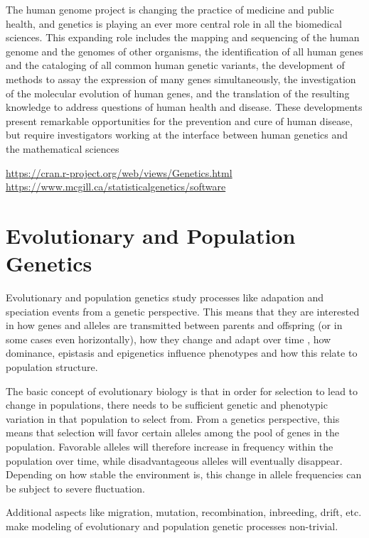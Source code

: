 \documentclass[12pt,]{krantz}
\renewenvironment{quote}{\begin{VF}}{\end{VF}}
\theoremstyle{definition}
\theoremstyle{definition}
\theoremstyle{definition}
\theoremstyle{remark}
\begin{document}
\begin{quote}
The human genome project is changing the practice of medicine and public
health, and genetics is playing an ever more central role in all the
biomedical sciences. This expanding role includes the mapping and
sequencing of the human genome and the genomes of other organisms, the
identification of all human genes and the cataloging of all common human
genetic variants, the development of methods to assay the expression of
many genes simultaneously, the investigation of the molecular evolution
of human genes, and the translation of the resulting knowledge to
address questions of human health and disease. These developments
present remarkable opportunities for the prevention and cure of human
disease, but require investigators working at the interface between
human genetics and the mathematical sciences
\end{quote}

\url{https://cran.r-project.org/web/views/Genetics.html}
\url{https://www.mcgill.ca/statisticalgenetics/software}

\chapter{Evolutionary and Population
Genetics}\label{evolutionary-and-population-genetics}

Evolutionary and population genetics study processes like adapation and
speciation events from a genetic perspective. This means that they are
interested in how genes and alleles are transmitted between parents and
offspring (or in some cases even horizontally), how they change and
adapt over time , how dominance, epistasis and epigenetics influence
phenotypes and how this relate to population structure.

The basic concept of evolutionary biology is that in order for selection
to lead to change in populations, there needs to be sufficient genetic
and phenotypic variation in that population to select from. From a
genetics perspective, this means that selection will favor certain
alleles among the pool of genes in the population. Favorable alleles
will therefore increase in frequency within the population over time,
while disadvantageous alleles will eventually disappear. Depending on
how stable the environment is, this change in allele frequencies can be
subject to severe fluctuation.

Additional aspects like migration, mutation, recombination, inbreeding,
drift, etc. make modeling of evolutionary and population genetic
processes non-trivial.
\end{document}
